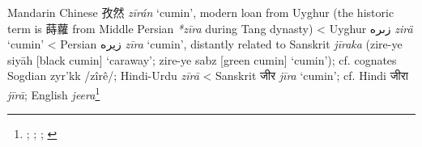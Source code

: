 \begin{etymology}\label{ety:ziran}
Mandarin Chinese {孜然} \textit{zī​rán} `cumin', modern loan from Uyghur (the historic term is 蒔蘿 from Middle Persian \textit{*zīra} during Tang dynasty)
< Uyghur {زىرە} \textit{zirä} `cumin'
< Persian {زیره} \textit{zīra} `cumin', distantly related to Sanskrit \textit{jīraka} (zire-ye siyāh [black cumin] `caraway'; zire-ye sabz [green cumin] `cumin'); cf. cognates Sogdian zyr'kk /zîrê/; Hindi-Urdu \textit{zīrā}
< Sanskrit {जीर} \textit{jīra} `cumin'; cf. Hindi जीरा \textit{jīrā}; English \textit{jeera}\footnote{\textcites[383]{laufer_sino-iranica_1919}[45]{sulaiman_uyghur_2020}[]{liu_hanyu_1985}; \textcite[561]{schwarz_uyghur-english_1992}; \textcite[634]{steingass_comprehensive_1892}; \textcites[375]{mcgregor_oxford_1993}}
\end{etymology}
